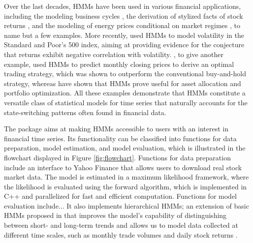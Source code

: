 \documentclass[article]{jss}
\begin{document}
Over the last decades, HMMs have been used in various financial applications, including the modeling business cycles \citep{kim98, gre00}, the derivation of stylized facts of stock returns \citep{bul06, nys15a}, and the modeling of energy prices conditional on market regimes \citep{lan18, ada22}, to name but a few examples.
More recently, \cite{lih17} used HMMs to model volatility in the Standard and Poor's 500 index, aiming at providing evidence for the conjecture that returns exhibit negative correlation with volatility. \cite{ngu18}, to give another example, used HMMs to predict monthly closing prices to derive an optimal trading strategy, which was shown to outperform the conventional buy-and-hold strategy, whereas \cite{bul11, nys15a, nys18} have shown that HMMs prove useful for asset allocation and portfolio optimization. All these examples demonstrate that HMMs constitute a versatile class of statistical models for time series that naturally accounts for the state-switching patterns often found in financial data.


The  package \citep{oel22} aims at making HMMs accessible to users with an interest in financial time series. Its functionality can be classified into functions for data preparation, model estimation, and model evaluation, which is illustrated in the flowchart displayed in Figure \ref{fig:flowchart}. Functions for data preparation include an interface to Yahoo Finance that allows users to download real stock market data. The model is estimated in a maximum likelihood framework, where the likelihood is evaluated using the forward algorithm, which is implemented in C++ and parallelized for fast and efficient computation. Functions for model evaluation include... It also implements hierarchical HMMs; an extension of basic HMMs proposed in \cite{oel21} that improves the model's capability of distinguishing between short- and long-term trends and allows us to model data collected at different time scales, such as monthly trade volumes and daily stock returns \citep{ada20}. 
\end{document}
